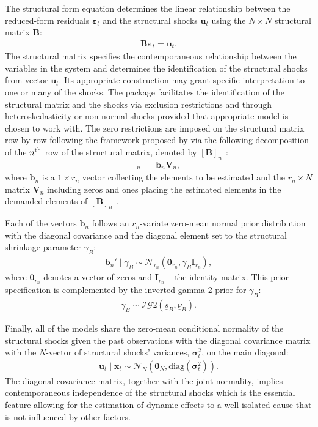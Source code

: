 \documentclass[
  nojss]{jss}
\begin{document}
The structural form equation determines the linear relationship between
the reduced-form residuals \(\boldsymbol{\varepsilon}_t\) and the
structural shocks \(\mathbf{u}_t\) using the \(N\times N\) structural
matrix \(\mathbf{B}\): \begin{align}
\mathbf{B}\boldsymbol{\varepsilon}_t = \mathbf{u}_t.\label{eq:sf}
\end{align} The structural matrix specifies the contemporaneous
relationship between the variables in the system and determines the
identification of the structural shocks from vector \(\mathbf{u}_t\).
Its appropriate construction may grant specific interpretation to one or
many of the shocks. The package  facilitates the
identification of the structural matrix and the shocks via exclusion
restrictions and through heteroskedasticity or non-normal shocks
provided that appropriate model is chosen to work with. The zero
restrictions are imposed on the structural matrix row-by-row following
the framework proposed by \cite{WaggonerZha2003} via the following
decomposition of the \(n\textsuperscript{th}\) row of the structural
matrix, denoted by \([\mathbf{B}]_{n\cdot}\): \begin{align}
[\mathbf{B}]_{n\cdot} = \mathbf{b}_n\mathbf{V}_n, \label{eq:restrictions}
\end{align} where \(\mathbf{b}_n\) is a \(1\times r_n\) vector
collecting the elements to be estimated and the \(r_n\times N\) matrix
\(\mathbf{V}_n\) including zeros and ones placing the estimated elements
in the demanded elements of \([\mathbf{B}]_{n\cdot}\).

Each of the vectors \(\mathbf{b}_n\) follows an \(r_n\)-variate
zero-mean normal prior distribution with the diagonal covariance and the
diagonal element set to the structural shrinkage parameter \(\gamma_B\):
\begin{align}
\mathbf{b}_n'\mid\gamma_B \sim\mathcal{N}_{r_n}\left( \mathbf{0}_{r_n}, \gamma_B\mathbf{I}_{r_n} \right),
\end{align} where \(\mathbf{0}_{r_n}\) denotes a vector of zeros and
\(\mathbf{I}_{r_n}\) -- the identity matrix. This prior specification is
complemented by the inverted gamma 2 prior for \(\gamma_B\):
\begin{align}
\gamma_B \sim\mathcal{IG}2\left(\underline{s}_B, \underline{\nu}_B\right).
\end{align}

Finally, all of the models share the zero-mean conditional normality of
the structural shocks given the past observations with the diagonal
covariance matrix with the \(N\)-vector of structural shocks' variances,
\(\boldsymbol{\sigma}_t^2\), on the main diagonal: \begin{align}
\mathbf{u}_t\mid\mathbf{x}_t \sim\mathcal{N}_{N}\left( \mathbf{0}_N, \text{diag}\left(\boldsymbol{\sigma}_t^2\right) \right).
\end{align} The diagonal covariance matrix, together with the joint
normality, implies contemporaneous independence of the structural shocks
which is the essential feature allowing for the estimation of dynamic
effects to a well-isolated cause that is not influenced by other
factors.
\end{document}
